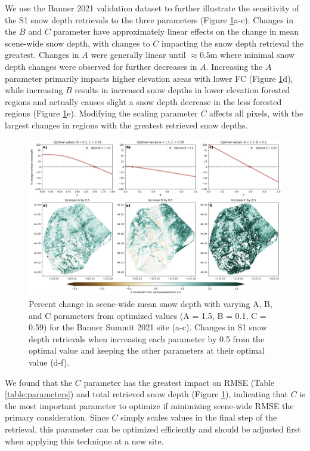 \documentclass[journal abbreviation, manuscript]{copernicus}
\begin{document}
We use the Banner 2021 validation dataset to further illustrate the sensitivity of the S1 snow depth retrievals to the three parameters (Figure \ref{fig:banner_params}a-c). Changes in the $B$ and $C$ parameter have approximately linear effects on the change in mean scene-wide snow depth, with changes to $C$ impacting the snow depth retrieval the greatest. Changes in $A$ were generally linear until $\approx$0.5m where minimal snow depth changes were observed for further decreases in $A$.  Increasing the $A$ parameter primarily impacts higher elevation areas with lower FC (Figure \ref{fig:banner_params}d), while increasing $B$ results in increased snow depths in lower elevation forested regions and actually causes slight a snow depth decrease in the less forested regions (Figure \ref{fig:banner_params}e). Modifying the scaling parameter $C$ affects all pixels, with the largest changes in regions with the greatest retrieved snow depths.

\begin{figure}
    \centering
    \includegraphics[width=\textwidth]{figures/appendix_parameters.png}
    \caption{Percent change in scene-wide mean snow depth with varying A, B, and C parameters from optimized values (A = 1.5, B = 0.1, C = 0.59) for the Banner Summit 2021 site (a-c). Changes in S1 snow depth retrievals when increasing each parameter by 0.5 from the optimal value and keeping the other parameters at their optimal value (d-f).}
    \label{fig:banner_params}
\end{figure}

We found that the $C$ parameter has the greatest impact on RMSE (Table \ref{table:parameters}) and total retrieved snow depth (Figure \ref{fig:banner_params}), indicating that $C$ is the most important parameter to optimize if minimizing scene-wide RMSE the primary consideration. Since $C$ simply scales values in the final step of the retrieval, this parameter can be optimized efficiently and should be adjusted first when applying this technique at a new site.
\end{document}
